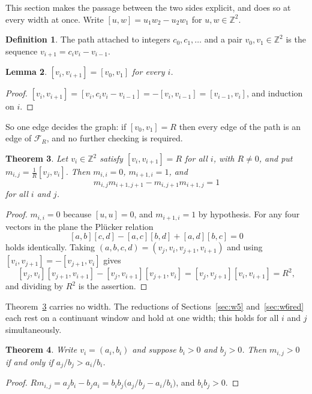 \documentclass[11pt]{article}
\theoremstyle{plain}
\newtheorem{theorem}{Theorem}[section]
\newtheorem{lemma}[theorem]{Lemma}
\theoremstyle{definition}
\newtheorem{definition}[theorem]{Definition}
\newcommand{\Z}{\mathbb{Z}}
\begin{document}
This section makes the passage between the two sides explicit, and does so at every width at
once. Write $[u,w]=u_1w_2-u_2w_1$ for $u,w\in\Z^2$.

\begin{definition}\label{def:path}
The path attached to integers $c_0,c_1,\dots$ and a pair $v_0,v_1\in\Z^2$ is the sequence
$v_{i+1}=c_iv_i-v_{i-1}$.
\end{definition}

\begin{lemma}\label{lem:pathdet}
$[v_i,v_{i+1}]=[v_0,v_1]$ for every $i$.
\end{lemma}

\begin{proof}
$[v_i,v_{i+1}]=[v_i,c_iv_i-v_{i-1}]=-[v_i,v_{i-1}]=[v_{i-1},v_i]$, and induction on $i$.
\end{proof}

So one edge decides the graph: if $[v_0,v_1]=R$ then every edge of the path is an edge of
$\mathcal F_R$, and no further checking is required.

\begin{theorem}\label{thm:pathfrieze}
Let $v_i\in\Z^2$ satisfy $[v_i,v_{i+1}]=R$ for all $i$, with $R\neq0$, and put
$m_{i,j}=\frac1R[v_j,v_i]$. Then $m_{i,i}=0$, $m_{i+1,i}=1$, and
\[
  m_{i,j}m_{i+1,j+1}-m_{i,j+1}m_{i+1,j}=1
\]
for all $i$ and $j$.
\end{theorem}

\begin{proof}
$m_{i,i}=0$ because $[u,u]=0$, and $m_{i+1,i}=1$ by hypothesis. For any four vectors in the
plane the Pl\"ucker relation
\[
  [a,b][c,d]-[a,c][b,d]+[a,d][b,c]=0
\]
holds identically. Taking $(a,b,c,d)=(v_j,v_i,v_{j+1},v_{i+1})$ and using
$[v_i,v_{j+1}]=-[v_{j+1},v_i]$ gives
\[
  [v_j,v_i][v_{j+1},v_{i+1}]-[v_j,v_{i+1}][v_{j+1},v_i]=[v_j,v_{j+1}][v_i,v_{i+1}]=R^2,
\]
and dividing by $R^2$ is the assertion.
\end{proof}

Theorem~\ref{thm:pathfrieze} carries no width. The reductions of Sections~\ref{sec:w5}
and~\ref{sec:w6red} each rest on a continuant window and hold at one width; this holds for
all $i$ and $j$ simultaneously.

\begin{theorem}\label{thm:clockpos}
Write $v_i=(a_i,b_i)$ and suppose $b_i>0$ and $b_j>0$. Then $m_{i,j}>0$ if and only if
$a_j/b_j>a_i/b_i$.
\end{theorem}

\begin{proof}
$Rm_{i,j}=a_jb_i-b_ja_i=b_ib_j\bigl(a_j/b_j-a_i/b_i\bigr)$, and $b_ib_j>0$.
\end{proof}
\end{document}
